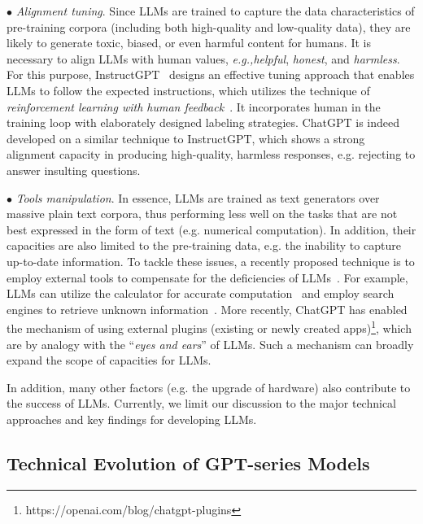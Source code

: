 $\bullet$ \emph{Alignment tuning}. Since  LLMs are trained to capture the data characteristics of pre-training corpora (including both high-quality and low-quality data),  they are likely to generate toxic, biased, or even harmful content for humans. It is necessary to align LLMs with human values, \emph{e.g.,}\emph{helpful}, \emph{honest}, and \emph{harmless}. For this purpose, InstructGPT~\cite{Ouyang-arxiv-2022-Training} designs an effective tuning approach that enables LLMs to follow the expected instructions, which utilizes the technique of  \emph{reinforcement learning with human feedback}~\cite{Christiano-NeurIPS-2017-Deep,Ouyang-arxiv-2022-Training}.  It incorporates human in the training  loop with elaborately designed labeling strategies. ChatGPT is indeed developed on a similar technique to InstructGPT,  which shows a strong alignment capacity in producing high-quality, harmless responses, e.g. rejecting to answer insulting questions. 

$\bullet$ \emph{Tools manipulation}. In essence, LLMs are trained as text generators over massive plain text corpora, thus performing less well on the tasks that are not best expressed in the form of text (e.g. numerical computation). In addition, their capacities are also limited to the pre-training data, e.g. the inability to capture up-to-date information. To tackle these issues, a recently proposed technique is to employ external tools to compensate for the deficiencies of LLMs~\cite{Schick-arxiv-2023-Toolformer,Nakano-arxiv-2021-WebGPT}. For example, LLMs can utilize the calculator for accurate computation~\cite{Schick-arxiv-2023-Toolformer} and employ search engines to retrieve unknown information~\cite{Nakano-arxiv-2021-WebGPT}. More recently, ChatGPT has enabled the mechanism of using external plugins (existing or newly created apps)\footnote{https://openai.com/blog/chatgpt-plugins}, which are by analogy with the ``\emph{eyes and ears}'' of LLMs.  Such a mechanism can broadly expand the scope of capacities for LLMs. 

In addition, many other factors (e.g. the upgrade of hardware) also contribute to the success of LLMs. Currently, we limit our discussion to the major technical approaches and key findings for developing LLMs.   

\subsection{Technical Evolution  of GPT-series Models}\label{sec-GPT-series}

